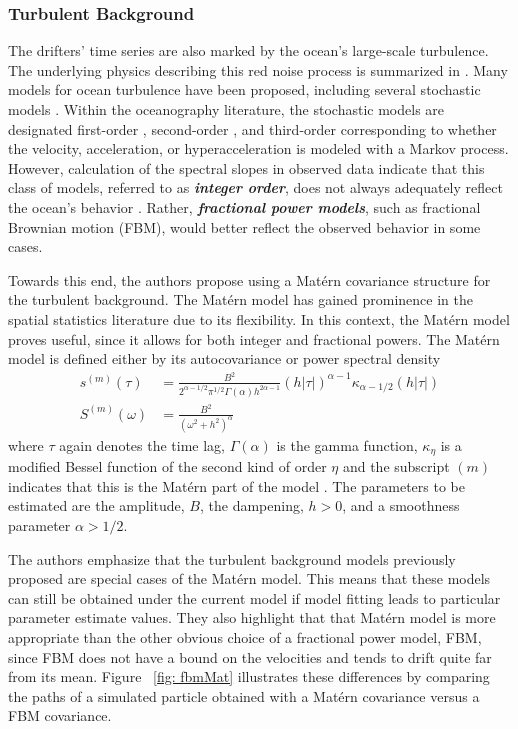 \documentclass{stat572Style}
\begin{document}
\subsubsection{Turbulent Background}
The drifters' time series are also marked by the ocean's large-scale turbulence. The underlying physics describing this red noise process is summarized in \citet{Rhines1979}. Many models for ocean turbulence have been proposed, including several stochastic models \citep{Lacasce2008}. Within the oceanography literature, the stochastic models are designated  first-order \citep{Griffa1995, Falco2000}, second-order \citep{Sawford1991}, and third-order corresponding to  whether the velocity, acceleration, or hyperacceleration is modeled with a Markov process. However, calculation of the spectral slopes in observed data indicate that this class of models, referred to as \textbf{\it{integer order}},  does not always adequately reflect the ocean's behavior \citep{Rupolo1996, Sanderson1991}. Rather, \textbf{\it{fractional power models}}, such as fractional Brownian motion (FBM), would better reflect the observed behavior in some cases.

Towards this end, the authors propose using a Mat\'{e}rn covariance structure \citep{Gneiting2012} for the turbulent background. The Mat\'{e}rn model has gained prominence in the spatial statistics literature due to its flexibility. In this context, the Mat\'{e}rn model proves useful, since it allows for both integer and fractional powers. The Mat\'{e}rn model is defined either by its autocovariance or power spectral density
\begin{align}
\label{eq:maternAC}
s^{(m)}(\tau) &= \frac{B^{2}}{2^{\alpha - 1/2}\pi^{1/2} \Gamma(\alpha) h^{2 \alpha - 1}}(h|\tau|)^{\alpha - 1}\kappa_{\alpha - 1/2}(h|\tau|)\\
\label{eq:maternPSD}
S^{(m)}(\omega) &= \frac{B^{2}}{(\omega^{2} + h^{2})^{\alpha}}
\end{align}
where $\tau$ again denotes the time lag, $\Gamma(\alpha)$ is the gamma function,  $\kappa_{\eta}$ is a modified Bessel function of the second kind of order $\eta$  and the subscript $(m)$ indicates that this is the Mat\'{e}rn part of the model \citep{Stein2012}. The parameters to be estimated are the amplitude, $B$, the dampening, $h > 0$, and a smoothness parameter $\alpha > 1/2$. 

The authors emphasize that the turbulent background models previously proposed are special cases of the Mat\'{e}rn model. This means that these models can still be obtained under the current model if model fitting leads to particular parameter estimate values. They also highlight that that Mat\'{e}rn model is more appropriate than the other obvious choice of a fractional power model, FBM, since FBM does not have a bound on the velocities and tends to drift quite far from its mean. Figure ~\ref{fig: fbmMat} illustrates these differences by comparing the paths of a simulated particle obtained with a Mat\'{e}rn  covariance versus a FBM covariance. 
\end{document}
